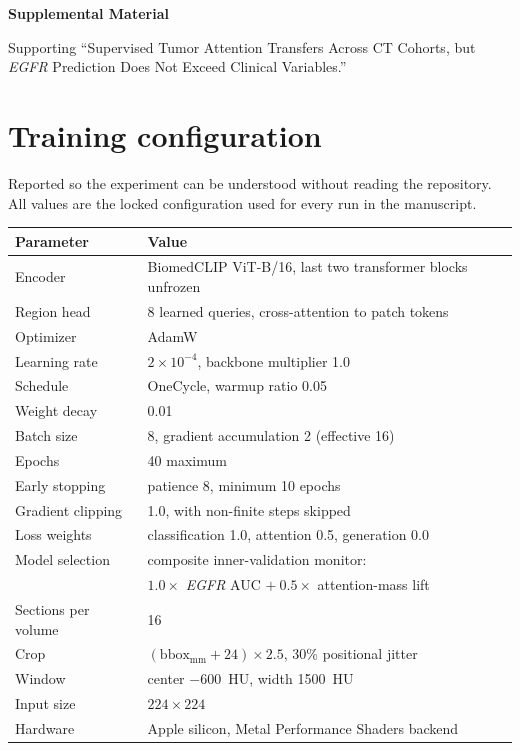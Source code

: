 \documentclass[11pt]{article}
\begin{document}
{\large\bfseries Supplemental Material\par}

Supporting ``Supervised Tumor Attention Transfers Across CT Cohorts, but
\textit{EGFR} Prediction Does Not Exceed Clinical Variables.''

\section{Training configuration}

Reported so the experiment can be understood without reading the repository.
All values are the locked configuration used for every run in the manuscript.

\begin{tabular}{ll}
\toprule
Parameter & Value \\
\midrule
Encoder & BiomedCLIP ViT-B/16, last two transformer blocks unfrozen \\
Region head & 8 learned queries, cross-attention to patch tokens \\
Optimizer & AdamW \\
Learning rate & $2\times10^{-4}$, backbone multiplier 1.0 \\
Schedule & OneCycle, warmup ratio 0.05 \\
Weight decay & 0.01 \\
Batch size & 8, gradient accumulation 2 (effective 16) \\
Epochs & 40 maximum \\
Early stopping & patience 8, minimum 10 epochs \\
Gradient clipping & 1.0, with non-finite steps skipped \\
Loss weights & classification 1.0, attention 0.5, generation 0.0 \\
Model selection & composite inner-validation monitor: \\
 & \quad $1.0\times$ \textit{EGFR} AUC $+\ 0.5\times$ attention-mass lift \\
Sections per volume & 16 \\
Crop & $(\text{bbox}_{\text{mm}} + 24)\times2.5$, 30\% positional jitter \\
Window & center $-600$~HU, width 1500~HU \\
Input size & $224\times224$ \\
Hardware & Apple silicon, Metal Performance Shaders backend \\
\bottomrule
\end{tabular}
\end{document}
